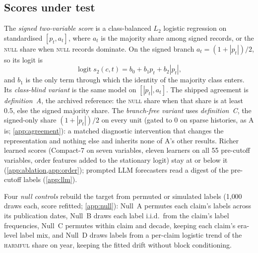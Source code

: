 \documentclass[11pt]{article}
\newcommand{\compact}{Compact-7\xspace}
\DeclareMathOperator{\logit}{logit}
\begin{document}
\subsection{Scores under test}
The \emph{signed two-variable score} is a class-balanced $L_2$ logistic regression on standardised
$[p_t,a_t]$, where $a_t$ is the majority share among signed records, or the \textsc{null} share when
\textsc{null} records dominate. On the signed branch $a_t=(1+|p_t|)/2$, so its logit is
\begin{equation}
\logit s_2(c,t)=b_0+b_1p_t+b_2|p_t|,
\label{eq:logit}
\end{equation}
and $b_1$ is the only term through which the identity of the majority class enters. Its
\emph{class-blind variant} is the same model on $[|p_t|,a_t]$. The shipped agreement is
\emph{definition~A}, the archived reference: the \textsc{null} share when that share is at least
0.5, else the signed majority share. The \emph{branch-free variant} uses \emph{definition~C}, the
signed-only share $(1+|p_t|)/2$ on every unit (gated to 0 on sparse histories, as A is;
\cref{app:agreement}): a matched diagnostic intervention that changes the representation and
nothing else and inherits none of A's other results. Richer learned scores (\compact on seven
variables, eleven learners on all 55 pre-cutoff variables, order features added to the
stationary logit) stay at or below it (\cref{app:ablation,app:order}); prompted LLM forecasters read a digest
of the pre-cutoff labels (\cref{app:llm}).

Four \emph{null controls} rebuild the target from permuted or simulated labels (1{,}000 draws each, score refitted;
\cref{app:null}): Null~A permutes each claim's labels across its publication dates, Null~B draws
each label i.i.d.\ from the claim's label frequencies, Null~C permutes within claim and decade,
keeping each claim's era-level label mix, and Null~D draws labels from a per-claim logistic trend
of the \textsc{harmful} share on year, keeping the fitted drift without block conditioning.
\end{document}
